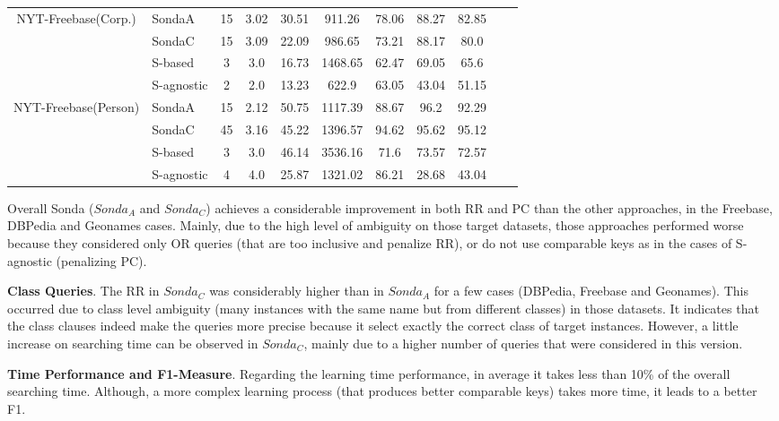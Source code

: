 \begin{center}
\begin{table*}[h]
\begin{tabular}{|c|l|c|c|c|c|c|c|c|c|c|}
\multirow{4}{*}{NYT-Freebase(Corp.)} & SondaA   & 15 & 3.02   & 30.51  & 911.26  & 78.06 & 88.27 & 82.85   \\
											 & SondaC   & 15 & 3.09   & 22.09  & 986.65  & 73.21 & 88.17 & 80.0\\
											& S-based     & 3 & 3.0   & 16.73  & 1468.65   & 62.47 & 69.05 & 65.6\\
 											& S-agnostic   & 2 & 2.0   & 13.23  & 622.9       & 63.05 & 43.04 & 51.15    \\ \hline 					
 											
\multirow{4}{*}{NYT-Freebase(Person)} & SondaA    & 15 & 2.12   & 50.75  & 1117.39   & 88.67 & 96.2 & 92.29\\
											& SondaC  &   45 & 3.16   & 45.22  & 1396.57  & 94.62 & 95.62 & 95.12\\
											& S-based       & 3 & 3.0   & 46.14  & 3536.16 &   71.6 & 73.57 & 72.57 \\
 											& S-agnostic    & 4 & 4.0   & 25.87  & 1321.02    & 86.21 & 28.68 & 43.04   \\ \hline 								

\end{tabular}  
\end{table*} 
\end{center}

Overall Sonda ($Sonda_A$ and $Sonda_C$) achieves a considerable improvement in both RR and PC than the other approaches, in the Freebase, DBPedia and Geonames cases. Mainly, due to the high level of ambiguity on those target datasets, those approaches performed worse because they considered only OR queries (that are too inclusive and penalize RR), or do not use comparable keys as in the cases of S-agnostic (penalizing PC).  

\textbf{Class Queries}. The RR in $Sonda_C$ was considerably higher than in $Sonda_A$ for a few cases (DBPedia, Freebase and Geonames). This occurred due to class level ambiguity (many instances with the same name but from different classes) in those datasets. It indicates that the class clauses indeed make the queries more precise because it select exactly the correct class of target instances. However, a little increase on searching time can be observed in $Sonda_C$, mainly due to a higher number of queries that were considered in this version.

\textbf{Time Performance and F1-Measure}. Regarding the learning time performance, in average it takes less than 10\% of the overall searching time. Although, a more complex learning process (that produces better comparable keys) takes more time, it leads to a better F1. 

